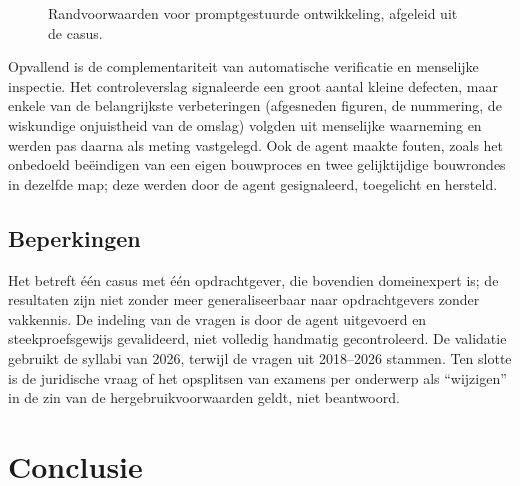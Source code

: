 \documentclass[10.5pt,a4paper]{article}
\begin{document}
\begin{figure}[H]
\centering
{}
\caption{Randvoorwaarden voor promptgestuurde ontwikkeling, afgeleid uit de casus.}
\label{fig:randvoorwaarden}
\end{figure}

Opvallend is de complementariteit van automatische verificatie en menselijke inspectie. Het controleverslag signaleerde
een groot aantal kleine defecten, maar enkele van de belangrijkste verbeteringen (afgesneden figuren, de nummering, de
wiskundige onjuistheid van de omslag) volgden uit menselijke waarneming en werden pas daarna als meting vastgelegd. Ook de
agent maakte fouten, zoals het onbedoeld beëindigen van een eigen bouwproces en twee gelijktijdige bouwrondes in dezelfde
map; deze werden door de agent gesignaleerd, toegelicht en hersteld.

\subsection{Beperkingen}
Het betreft één casus met één opdrachtgever, die bovendien domeinexpert is; de resultaten zijn niet zonder meer
generaliseerbaar naar opdrachtgevers zonder vakkennis. De indeling van de vragen is door de agent uitgevoerd en
steekproefsgewijs gevalideerd, niet volledig handmatig gecontroleerd. De validatie gebruikt de syllabi van 2026, terwijl de
vragen uit 2018--2026 stammen. Ten slotte is de juridische vraag of het opsplitsen van examens per onderwerp als
``wijzigen'' in de zin van de hergebruikvoorwaarden geldt, niet beantwoord.

\section{Conclusie}
\end{document}
